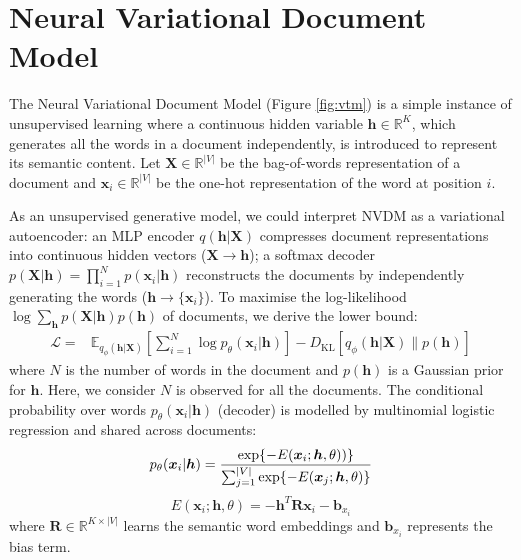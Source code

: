 \documentclass{article}
\newcommand{\tmmathbf}[1]{\ensuremath{\boldsymbol{#1}}}
\newcommand{\tmop}[1]{\ensuremath{\operatorname{#1}}}
\begin{document}
\section{Neural Variational Document Model}
\label{sec:vtm}\label{sec:vtm}The Neural Variational Document Model (Figure \ref{fig:vtm}) is a simple instance of unsupervised learning  where a continuous hidden variable $\tmmathbf{h} \in \mathbb{R}^K$, which generates all the words in a document independently, is introduced to represent its semantic content. 
Let $\tmmathbf{X} \in \mathbb{R}^{|V|}$ be the bag-of-words representation of a document and $\tmmathbf{x}_i\in \mathbb{R}^{|V|}$ be the one-hot representation of the word at position $i$. 

As an unsupervised generative model, we could interpret NVDM as a variational autoencoder: an MLP encoder $q(\tmmathbf{h}|\tmmathbf{X})$ compresses document representations into continuous hidden vectors ($\tmmathbf{X} \to \tmmathbf{h}$); a softmax decoder $p(\tmmathbf{X}|\tmmathbf{h})=\prod_{i=1}^N p(\tmmathbf{x}_i|\tmmathbf{h})$ reconstructs the documents by independently generating the words ($\tmmathbf{h} \to \{\tmmathbf{x}_i\}$). 
To maximise the log-likelihood $\log \sum\nolimits_{\tmmathbf{h}} p(\tmmathbf{X}|\tmmathbf{h})p(\tmmathbf{h})$ of documents, we derive the lower bound:
\begin{align}
   \mathcal{L}\!\!  = & \mathbb{E}_{q_{\phi}\! (
  \tmmathbf{h} | \tmmathbf{X})} \!  \left[\! \sum_{i = 1}^N \! \log p_{\theta}\!
  ( \tmmathbf{x}_{i} | \tmmathbf{\tmmathbf{h}}) \!\right] \!\!  -  \!\! D_{\tmop{KL}} [q_{\phi} \! ( \tmmathbf{h} | \tmmathbf{X}\!)\|p (
  \tmmathbf{h})  ]  \label{eq:lb}
\end{align}
where $N$ is the number of words in the document and $p(\tmmathbf{h})$ is a Gaussian prior for $\tmmathbf{h}$. 
Here, we consider $N$ is observed for all the documents.
The conditional probability over words $p_\theta(\tmmathbf{x}_i|\tmmathbf{h})$ (decoder) is modelled by multinomial logistic regression and shared across documents:
\begin{equation}
  p_{\theta} ( \tmmathbf{x}_i | \tmmathbf{h}  ) = \frac{\exp \{- E (
  \tmmathbf{x}_i ; \tmmathbf{h}, \theta))\}}{\sum_{j = 1}^{|V|} \exp \{- E (
  \tmmathbf{x}_j ; \tmmathbf{h}, \theta) \}}
  \vspace{-0.5em}
\end{equation}
\begin{equation}
  E ( \tmmathbf{x}_i ; \tmmathbf{h}, \theta) = - \tmmathbf{h}^T \tmmathbf{R}
  \tmmathbf{x}_i - \tmmathbf{b}_{x_i}
\end{equation}
where $\tmmathbf{R} \in \mathbb{R}^{K \times |V|}$ learns the semantic word embeddings and $\tmmathbf{b}_{x_i}$ represents the bias term.
\end{document}
